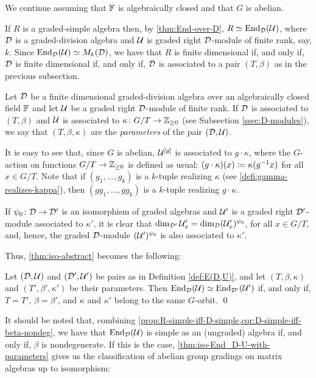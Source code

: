 We continue assuming that $\mathbb{F}$ is algebraically closed and that $G$ is abelian.

If $R$ is a graded-simple algebra then, by \cref{thm:End-over-D}, $R \simeq \operatorname{End}_{\mathcal{D}} (\mathcal U)$, where $\mathcal{D}$ is a graded-division algebra and $\mathcal U$ is graded right $\mathcal{D}$-module of finite rank, say, $k$. 
Since $\operatorname{End}_{\mathcal{D}} (\mathcal U) \simeq M_k(\mathcal{D})$, we have that $R$ is finite dimensional if, and only if, $\mathcal{D}$ is finite dimensional if, and only if, $\mathcal{D}$ is associated to a pair $(T,\beta)$ as in the previous subsection.

\begin{defi}\label{def:E(D,U)}
    Let $\mathcal{D}$ be a finite dimensional graded-division algebra over an algebraically closed field $\mathbb{F}$ and let $\mathcal U$ be a graded right $\mathcal{D}$-module of finite rank. 
	If $\mathcal{D}$ is associated to $(T, \beta)$ and $\mathcal U$ is associated to $\kappa\colon G/T \to \mathbb{Z}_{\geq 0}$ (see Subsection \ref{ssec:D-modules}), we say that $(T, \beta, \kappa)$ are the \emph{parameters} of the pair $(\mathcal{D}, \mathcal U)$.
\end{defi}

It is easy to see that, since $G$ is abelian, $\mathcal U^{[g]}$ is associated to $g \cdot \kappa$, where the $G$-action on functions $G/T \to \mathbb{Z}_{\geq 0}$ is defined as usual: $(g\cdot \kappa) (x) \coloneqq \kappa(g^{-1} x)$ for all $x\in G/T$. 
Note that if $(g_1, \ldots, g_k)$ is a $k$-tuple realizing $\kappa$ (see \cref{defi:gamma-realizes-kappa}), then $(gg_1, \ldots, gg_k)$ is a $k$-tuple realizing $g\cdot \kappa$. 

If $\psi_0\colon \mathcal{D} \to \mathcal{D}'$ is an isomorphism of graded algebras and $\mathcal U'$ is a graded right $\mathcal{D}'$-module associated to $\kappa'$, it is clear that $\dim_{\mathcal{D}'} \mathcal U_x' = \dim_{\mathcal{D}} (\mathcal U_x')^{\psi_0}$, for all $x \in G/T$, and, hence, the graded $\mathcal{D}$-module $(\mathcal U')^{\psi_0}$ is also associated to $\kappa'$. 

Thus, \cref{thm:iso-abstract} becomes the following:

\begin{thm}\label{thm:iso-End_D-U-with-parameters}
	Let $(\mathcal{D}, \mathcal U)$ and $(\mathcal{D}', \mathcal U')$ be pairs as in Definition \ref{def:E(D,U)}, and let $(T, \beta, \kappa)$ and $(T', \beta', \kappa')$ be their parameters. 
	Then $\operatorname{End}_{\mathcal{D}} (\mathcal U) \simeq \operatorname{End}_{\mathcal{D}'} (\mathcal U')$ if, and only if, $T = T'$, $\beta = \beta'$, and $\kappa$ and $\kappa'$ belong to the same $G$-orbit. \qed 
\end{thm}

It should be noted that, combining \cref{prop:R-simple-iff-D-simple,cor:D-simple-iff-beta-nondeg}, we have that $\operatorname{End}_{\mathcal{D}} (\mathcal U)$ is simple as an (ungraded) algebra if, and only if, $\beta$ is nondegenerate. 
If this is the case, \cref{thm:iso-End_D-U-with-parameters} gives us the classification of abelian group gradings on matrix algebras up to isomorphism:

